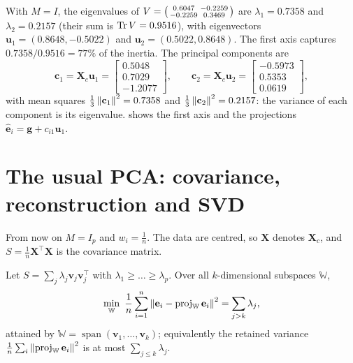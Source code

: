 \begin{notechapter}
\begin{example}\label{pca-overview:ex:axes}
With $M = I$, the eigenvalues of
$V = \begin{psmallmatrix}0.6047 & -0.2259\\ -0.2259 & 0.3469\end{psmallmatrix}$ are
$\lambda_1 = 0.7358$ and $\lambda_2 = 0.2157$ (their sum is $\operatorname{Tr} V = 0.9516$), with eigenvectors
$\mathbf u_1 = (0.8648, -0.5022)$ and $\mathbf u_2 = (0.5022, 0.8648)$. The first axis captures
$0.7358/0.9516 = 77\%$ of the inertia. The principal components are
\[
  \mathbf c_1 = \mathbf X_c\mathbf u_1 = \begin{bmatrix}0.5048\\0.7029\\-1.2077\end{bmatrix},\qquad
  \mathbf c_2 = \mathbf X_c\mathbf u_2 = \begin{bmatrix}-0.5973\\0.5353\\0.0619\end{bmatrix},
\]
with mean squares $\frac13\left\|\mathbf c_1\right\|^2 = 0.7358$ and $\frac13\left\|\mathbf c_2\right\|^2 = 0.2157$: the variance of each
component is its eigenvalue.  shows the first axis and the
projections $\hat{\mathbf e}_i = \mathbf g + c_{i1}\mathbf u_1$.
\end{example}

\section{The usual PCA: covariance, reconstruction and SVD}\label{pca-overview:sec:usual}

From now on $M = I_p$ and $w_i = \frac1n$. The data are centred, so $\mathbf X$ denotes $\mathbf X_c$,
and $S = \frac1n\mathbf X^\top\mathbf X$ is the covariance matrix.

\begin{theorem}\label{pca-overview:thm:best}
Let $S = \sum_j\lambda_j\mathbf v_j\mathbf v_j^\top$ with $\lambda_1\geq\dots\geq\lambda_p$. Over all $k$-dimensional
subspaces $\mathbb W$,
\[
  \min_{\mathbb W}\ \frac1n\sum_{i=1}^n\norm{\mathbf e_i - \operatorname{proj}_{\mathbb W}\mathbf e_i}^2 = \sum_{j>k}\lambda_j,
\]
attained by $\mathbb W = \operatorname{span}(\mathbf v_1,\dots,\mathbf v_k)$; equivalently the retained variance
$\frac1n\sum_i\left\|\operatorname{proj}_{\mathbb W}\mathbf e_i\right\|^2$ is at most $\sum_{j\leq k}\lambda_j$.
\end{theorem}


\end{notechapter}
